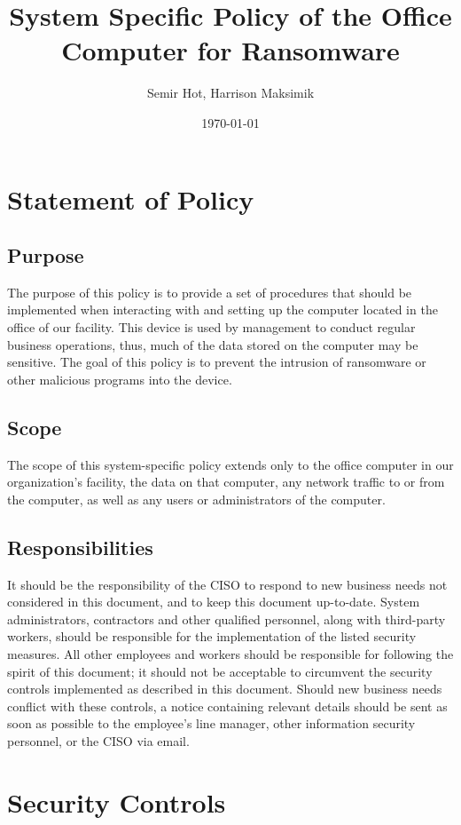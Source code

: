 \documentclass[11pt]{article}
\author{Semir Hot, Harrison Maksimik}
\date{\today}
\title{System Specific Policy of the Office Computer for Ransomware}
\begin{document}
\maketitle
\tableofcontents

\section{Statement of Policy}
\label{sec:orgaf95d4a}
\subsection{Purpose}
\label{sec:orgdb9e080}
The purpose of this policy is to provide a set of procedures that should be implemented when interacting with and setting up the computer located in the office of our facility. This device is used by management to conduct regular business operations, thus, much of the data stored on the computer may be sensitive. The goal of this policy is to prevent the intrusion of ransomware or other malicious programs into the device.

\subsection{Scope}
\label{sec:orgee66c9a}
The scope of this system-specific policy extends only to the office computer in our organization's facility, the data on that computer, any network traffic to or from the computer, as well as any users or administrators of the computer.

\subsection{Responsibilities}
\label{sec:org3699809}
It should be the responsibility of the CISO to respond to new business needs not considered in this document, and to keep this document up-to-date. System administrators, contractors and other qualified personnel, along with third-party workers, should be responsible for the implementation of the listed security measures. All other employees and workers should be responsible for following the spirit of this document; it should not be acceptable to circumvent the security controls implemented as described in this document. Should new business needs conflict with these controls, a notice containing relevant details should be sent as soon as possible to the employee's line manager, other information security personnel, or the CISO via email.

\section{Security Controls}
\label{sec:org61ff036}
\end{document}

